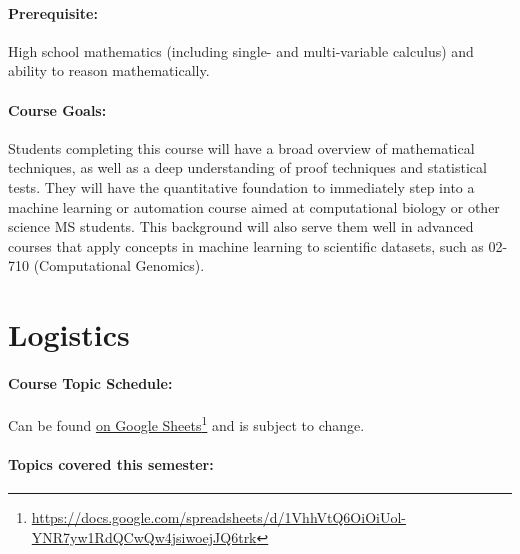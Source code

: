 \documentclass[12pt]{scrartcl}
\begin{document}

\paragraph{Prerequisite:} 
High school mathematics (including single- and multi-variable calculus) and ability to reason mathematically.

\paragraph{Course Goals:} 
Students completing this course will have a broad overview of mathematical techniques, 
as well as a deep understanding of proof techniques and statistical tests. 
They will have the quantitative foundation to immediately step into a machine learning or 
automation course aimed at computational biology or other science MS students. 
This background will also serve them well in advanced courses that apply concepts in machine learning 
to scientific datasets, such as 02-710 (Computational Genomics).

\clearpage
\tableofcontents





\clearpage
\section{Logistics}

\paragraph{Course Topic Schedule:} Can be found \href{https://docs.google.com/spreadsheets/d/1VhhVtQ6OiOiUol-YNR7yw1RdQCwQw4jsiwoejJQ6trk}{on Google Sheets}\footnote{\url{https://docs.google.com/spreadsheets/d/1VhhVtQ6OiOiUol-YNR7yw1RdQCwQw4jsiwoejJQ6trk}}
and is subject to change.


\paragraph{Topics covered this semester:}
\end{document}
